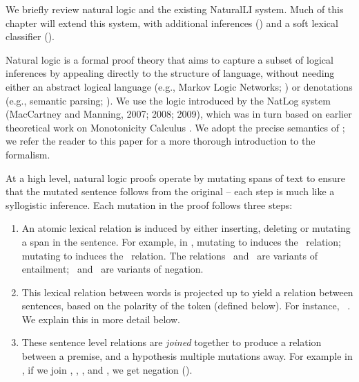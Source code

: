 We briefly review natural logic and the existing NaturalLI system.
Much of this chapter will extend this system, with additional inferences
  () and a soft lexical classifier ().

Natural logic is a formal proof theory that 
  aims to capture a subset of logical
  inferences by appealing directly to the structure of language,
  without needing either an abstract logical language 
  (e.g., Markov Logic Networks; )
  or denotations (e.g., semantic parsing; ).
We use the logic
  introduced by the NatLog system (MacCartney and Manning, 2007; 2008; 2009),
  \nocite{key:2007maccartney-natlog}
  \nocite{key:2008maccartney-natlog}
  \nocite{key:2009maccartney-natlog} %
  which was in turn
  based on earlier theoretical work on Monotonicity Calculus
  \cite{key:1986benthem-natlog,key:1991valencia-natlog}.
We adopt the precise semantics of ;
  we refer the reader to this paper for a more thorough introduction to
  the formalism.

At a high level, natural logic proofs operate by mutating spans of text
  to ensure that the mutated sentence follows from the
  original -- each step is much like a syllogistic inference.
Each mutation in the proof follows three steps:

\begin{enumerate}
\setlength\itemsep{-0.25em}
\item An atomic lexical relation is induced by either inserting, deleting
      or mutating a span in the sentence. 
      For example, in ,
      mutating  to  induces the \negate\ relation;
      mutating  to  induces the \forward\ relation.
      The relations \equivalent\ and \forward\ are variants of  entailment;
      \negate\ and \alternate\ are variants of negation.

\item This lexical relation between words is projected up to yield a relation between
      sentences, based on the polarity of the token (defined below).
      For instance,  \forward\ .
      We explain this in more detail below.

\item These sentence level relations are \textit{joined} together to produce a
      relation between a premise, and a hypothesis multiple mutations away.
      For example in , if we join 
      \forward, \equivalent, \forward, and \negate, we
      get negation (\alternate).
\end{enumerate}

